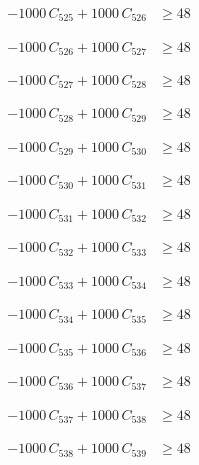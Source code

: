 \documentclass[a4paper,11pt]{article}
\begin{document}
\begin{align}
-1000\,C_{525} + 1000\,C_{526} &\geq 48 \nonumber
\end{align}

\begin{align}
-1000\,C_{526} + 1000\,C_{527} &\geq 48 \nonumber
\end{align}

\begin{align}
-1000\,C_{527} + 1000\,C_{528} &\geq 48 \nonumber
\end{align}

\begin{align}
-1000\,C_{528} + 1000\,C_{529} &\geq 48 \nonumber
\end{align}

\begin{align}
-1000\,C_{529} + 1000\,C_{530} &\geq 48 \nonumber
\end{align}

\begin{align}
-1000\,C_{530} + 1000\,C_{531} &\geq 48 \nonumber
\end{align}

\begin{align}
-1000\,C_{531} + 1000\,C_{532} &\geq 48 \nonumber
\end{align}

\begin{align}
-1000\,C_{532} + 1000\,C_{533} &\geq 48 \nonumber
\end{align}

\begin{align}
-1000\,C_{533} + 1000\,C_{534} &\geq 48 \nonumber
\end{align}

\begin{align}
-1000\,C_{534} + 1000\,C_{535} &\geq 48 \nonumber
\end{align}

\begin{align}
-1000\,C_{535} + 1000\,C_{536} &\geq 48 \nonumber
\end{align}

\begin{align}
-1000\,C_{536} + 1000\,C_{537} &\geq 48 \nonumber
\end{align}

\begin{align}
-1000\,C_{537} + 1000\,C_{538} &\geq 48 \nonumber
\end{align}

\begin{align}
-1000\,C_{538} + 1000\,C_{539} &\geq 48 \nonumber
\end{align}
\end{document}
